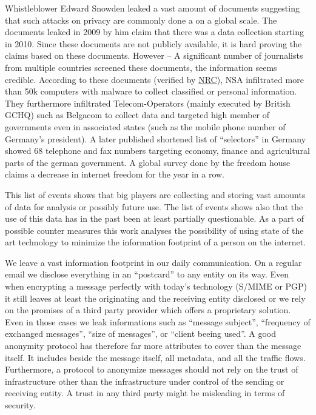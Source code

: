 Whistleblower Edward Snowden leaked a vast amount of documents suggesting that such attacks on privacy are commonly done a on a global scale. The documents leaked in 2009 by him claim that there was a data collection starting in 2010. Since these documents are not publicly available, it is hard proving the claims based on these documents. However -- A significant number of journalists from multiple countries screened these documents, the information seems credible. According to these documents (verified by \href{http://www.nrc.nl/nieuws/2013/11/23/nederland-sinds-1946-doelwit-van-nsa}{NRC}), NSA infiltrated more than 50k computers with malware to collect classified or personal information. They furthermore infiltrated Telecom-Operators (mainly executed by British GCHQ) such as Belgacom to collect data and targeted high member of governments even in associated states (such as the mobile phone number of Germany's president). A later published shortened list of ``selectors'' in Germany showed 68 telephone and fax numbers targeting economy, finance and agricultural parts of the german government. A global survey done by the freedom house\cite{FOTN2018} claims a decrease in internet freedom for the  year in a row. 

This list of events shows that big players are collecting and storing vast amounts of data for analysis or possibly future use. The list of events shows also that the use of this data has in the past been at least partially questionable. As a part of possible counter measures this work analyses the possibility of using state of the art technology to minimize the information footprint of a person on the internet. 

We leave a vast information footprint in our daily communication. On a regular email we disclose everything in an ``postcard'' to any entity on its way. Even when encrypting a message perfectly with today's technology (S/MIME\cite{RFC2045} or PGP\cite{RFC2015}) it still leaves at least the originating and the receiving entity disclosed or we rely on the promises of a third party provider which offers a proprietary solution. Even in those cases we leak informations such as ``message subject'', ``frequency of exchanged messages'', ``size of messages'', or ``client beeing used''. A good anonymity protocol has therefore far more attributes to cover than the message itself. It includes beside the message itself, all metadata, and all the traffic flows. Furthermore, a protocol to anonymize messages should not rely on the trust of infrastructure other than the infrastructure under control of the sending or receiving entity. A trust in any third party might be misleading in terms of security.

